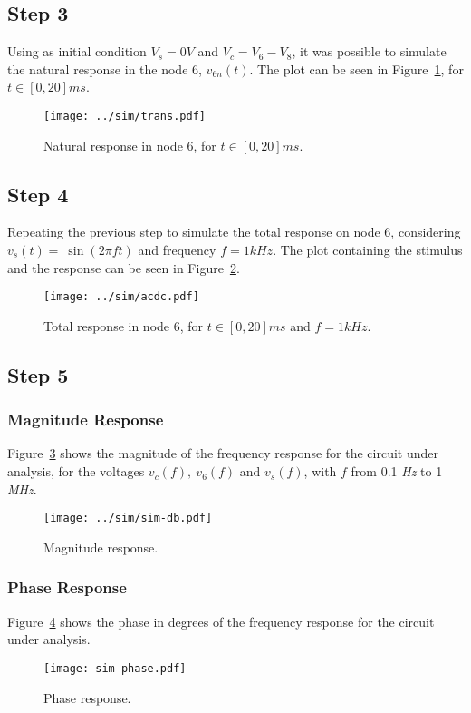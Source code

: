 \subsection{Step 3}

Using as initial condition $V_s=0V$ and $V_c = V_6-V_8$, it was possible to simulate the natural response in the node 6, $v_{6n}(t)$. The plot can be seen in Figure~\ref{fig:sim-v6n}, for $t\in [0,20]ms$.

\begin{figure}[ht!]
    \centering
    \texttt{[image: ../sim/trans.pdf]}
    \caption{Natural response in node 6, for $t\in [0,20]ms$.}
    \label{fig:sim-v6n}
\end{figure}
\FloatBarrier




\subsection{Step 4}
Repeating the previous step to simulate the total response on node 6, considering $v_s(t)=~\sin(2 \pi f t)$ and frequency $f=1 kHz$. The plot containing the stimulus and the response can be seen in Figure~\ref{fig:sim-v6total}.

\begin{figure}[ht!]
    \centering
    \texttt{[image: ../sim/acdc.pdf]}
    \caption{Total response in node 6, for $t\in [0,20]ms$ and $f=1 kHz$.}
    \label{fig:sim-v6total}
\end{figure}
\FloatBarrier



\subsection{Step 5}

\subsubsection{Magnitude Response}

Figure~\ref{fig:sim-db} shows the magnitude of the frequency response for the
circuit under analysis, for the voltages $v_c(f),\ v_6(f)$ and $v_s(f)$, with $f$ from 0.1 \textit{Hz} to 1 \textit{MHz}.

\begin{figure}[ht!] \centering
\texttt{[image: ../sim/sim-db.pdf]}
\caption{Magnitude response.}
\label{fig:sim-db}
\end{figure}
\FloatBarrier


\subsubsection{Phase Response}

Figure~\ref{fig:sim-phase} shows the phase in degrees of the frequency response for the
circuit under analysis.

\begin{figure}[ht!] \centering
\texttt{[image: sim-phase.pdf]}
\caption{Phase response.}
\label{fig:sim-phase}
\end{figure}
\FloatBarrier
